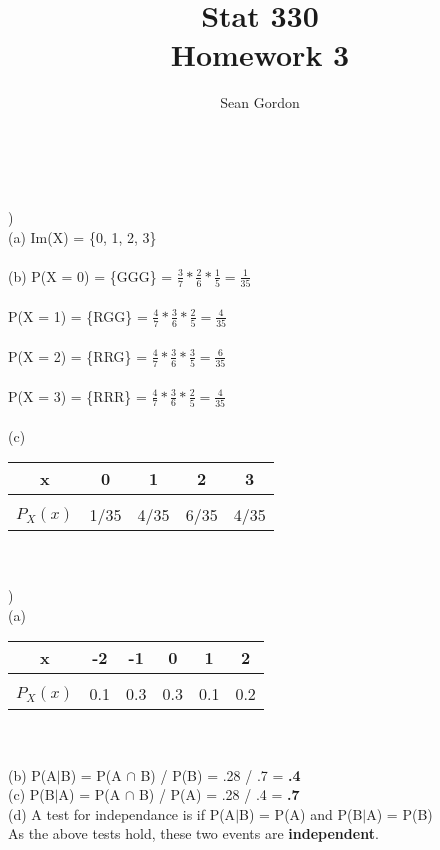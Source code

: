 \documentclass[12pt]{article}
\title{Stat 330\\Homework 3}
\author{Sean Gordon}
\begin{document}
\maketitle


\noindent\hrulefill \\
\indent \indent  \hrulefill \indent \indent \indent \\


)\\
\indent (a) Im(X) = \{0, 1, 2, 3\}\\\\

\indent        (b) P(X = 0) =  \{GGG\} = {\Large$ \frac{3}{7}*\frac{2}{6}*\frac{1}{5} = \frac{1}{35}$}\\\\
\indent \indent P(X = 1) =  \{RGG\} = {\Large$ \frac{4}{7}*\frac{3}{6}*\frac{2}{5} = \frac{4}{35}$}\\\\
\indent \indent P(X = 2) =  \{RRG\} = {\Large$ \frac{4}{7}*\frac{3}{6}*\frac{3}{5} = \frac{6}{35}$}\\\\
\indent \indent P(X = 3) =  \{RRR\} = {\Large$ \frac{4}{7}*\frac{3}{6}*\frac{2}{5} = \frac{4}{35}$}\\\\


\indent (c)
\begin{tabular}{c|cccc}
 x & 0 & 1 & 2 & 3 \\
 \hline &&&&\\[-1em]
$P_X(x)$ & 1/35 & 4/35 & 6/35 & 4/35\\
\end{tabular}\\


\noindent \hrulefill \\


)\\
\indent (a)
\begin{tabular}{c|ccccc}
 x & -2 & -1 & 0 & 1 & 2 \\
 \hline &&&&&\\[-1em]
$P_X(x)$ & 0.1 & 0.3 & 0.3 & 0.1 & 0.2\\
\end{tabular}\\\\
\indent (b) P(A$|$B) = P(A $\cap$ B) / P(B) = .28 / .7 = \textbf{.4}\\
\indent (c) P(B$|$A) = P(A $\cap$ B) / P(A) = .28 / .4 = \textbf{.7}\\
\indent (d) A test for independance is if P(A$|$B) = P(A) and P(B$|$A) = P(B)\\
\indent \indent As the above tests hold, these two events are \textbf{independent}.\\
\end{document}

